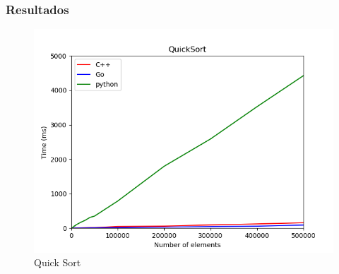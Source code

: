 \documentclass[
	11pt, %
]{beamer}
\begin{document}


\begin{frame}
	\frametitle{Resultados}
	\begin{figure}
		\includegraphics[width=0.8\linewidth]{QuickSort_1.png}
		\caption{Quick Sort}
	\end{figure}
\end{frame}

\end{document}
